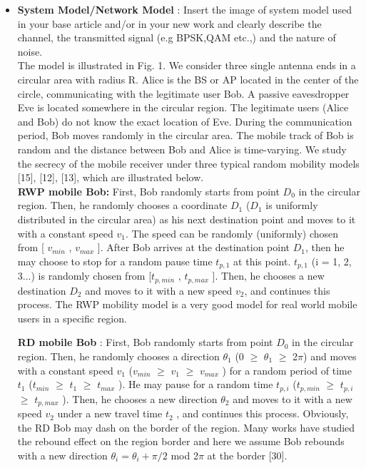 \documentclass{article}
\begin{document}
\begin{itemize}
\item \textbf{System Model/Network Model} : Insert the image of system model used in your base article and/or in your new work and clearly describe the channel, the transmitted signal (e.g BPSK,QAM etc.,) and the nature of noise.
\\
The model is illustrated in Fig. 1. We consider three single
antenna ends in a circular area with radius R. Alice is the BS
or AP located in the center of the circle, communicating with
the legitimate user Bob. A passive eavesdropper Eve is located
somewhere in the circular region. The legitimate users (Alice
and Bob) do not know the exact location of Eve. During the
communication period, Bob moves randomly in the circular
area. The mobile track of Bob is random and the distance
between Bob and Alice is time-varying. We study the secrecy
of the mobile receiver under three typical random mobility
models [15], [12], [13], which are illustrated below. \\
\textbf{RWP mobile Bob:} First, Bob randomly starts from point $D_0$
in the circular region. Then, he randomly chooses a coordinate
$D_1$ ($D_1$ is uniformly distributed in the circular area) as his next
destination point and moves to it with a constant speed $v_1$. The
speed can be randomly (uniformly) chosen from [ $v_{min}$ , $v_{max}$ ].
After Bob arrives at the destination point $D_1$, then he may
choose to stop for a random pause time $t_{p,1}$ at this point.
$t_{p,1}$ (i = 1, 2, 3...) is randomly chosen from [$t_{p,min}$ , $t_{p,max}$ ].
Then, he chooses a new destination $D_2$ and moves to it with a
new speed $v_2$, and continues this process. The RWP mobility
model is a very good model for real world mobile users in a
specific region. 

\textbf{RD mobile Bob} : First, Bob randomly starts from point $D_0$
in the circular region. Then, he randomly chooses a direction
$\theta_1$ (0 $\geq$ $\theta_1$ $\geq$ 2$\pi$) and moves with a constant speed $v_1$ ($v_{min}$ $\geq$
$v_1$ $\geq$ $v_{max}$ ) for a random period of time $t_1$ ($t_{min}$ $\geq$ $t_1$ $\geq$ $t_{max}$ ).
He may pause for a random time $t_{p,i}$ ($t_{p,min}$ $\geq$ $t_{p,i}$ $\geq$ $t_{p,max}$ ).
Then, he chooses a new direction $\theta_2$ and moves to it with a
new speed $v_2$ under a new travel time $t_2$ , and continues this
process. Obviously, the RD Bob may dash on the border of
the region. Many works have studied the rebound effect on
the region border and here we assume Bob rebounds with a
new direction $\theta_i = \theta_i + \pi/2$ mod 2$\pi$ at the border [30].\\


\end{itemize}
\end{document}
